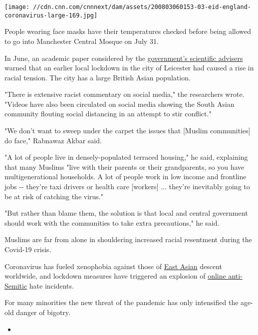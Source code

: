 \texttt{[image: //cdn.cnn.com/cnnnext/dam/assets/200803060153-03-eid-england-coronavirus-large-169.jpg]}

People wearing face masks have their temperatures checked before being
allowed to go into Manchester Central Mosque on July 31.

In June, an academic paper considered by the
\href{https://assets.publishing.service.gov.uk/government/uploads/system/uploads/attachment_data/file/906354/s0578-spi-b-public-disorder-public-health-contemporary-threats-risks.pdf}{government's
scientific advisers} warned that an earlier local lockdown in the city
of Leicester had caused a rise in racial tension. The city has a large
British Asian population.

"There is extensive racist commentary on social media," the researchers
wrote. "Videos have also been circulated on social media showing the
South Asian community flouting social distancing in an attempt to stir
conflict."

"We don't want to sweep under the carpet the issues that {[}Muslim
communities{]} do face," Rabnawaz Akbar said.

"A lot of people live in densely-populated terraced housing," he said,
explaining that many Muslims "live with their parents or their
grandparents, so you have multigenerational households. A lot of people
work in low income and frontline jobs -\/- they're taxi drivers or
health care {[}workers{]} ... they're inevitably going to be at risk of
catching the virus."

"But rather than blame them, the solution is that local and central
government should work with the communities to take extra precautions,"
he said.

Muslims are far from alone in shouldering increased racial resentment
during the Covid-19 crisis.

Coronavirus has fueled xenophobia against those of
\href{https://cnn.com/2020/04/10/us/sinophobic-racism-rise-coronavirus-research-trnd/index.html}{East
Asian} descent worldwide, and lockdown measures have triggered an
explosion of
\href{https://cnn.com/2020/07/30/uk/online-anti-semitism-intl-scli-gbr/index.html}{online
anti-Semitic} hate incidents.

For many minorities the new threat of the pandemic has only intensified
the age-old danger of bigotry.

\begin{itemize}
\item
\end{itemize}

